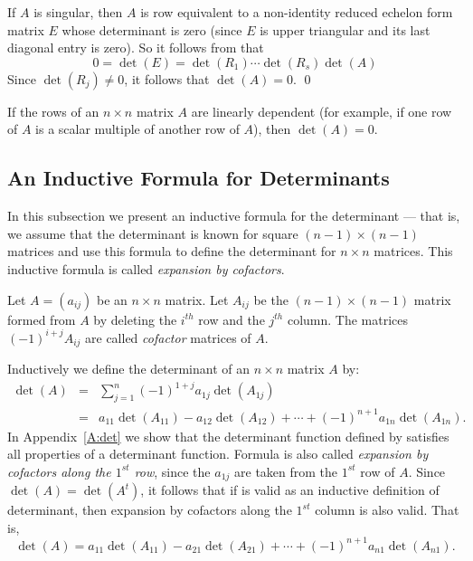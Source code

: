 \documentclass{ximera}
\begin{document}
If $A$ is singular, then $A$ is row equivalent to a non-identity
reduced echelon form matrix $E$ whose determinant is zero (since
$E$ is upper triangular and its last diagonal entry is zero).
So it follows from
 that 
\[
0=\det(E) = \det(R_1)\cdots\det(R_s)\det(A)
\]
Since $\det(R_j)\neq 0$, it follows that $\det(A)=0$.  \qed

\begin{cor}
If the rows of an $n\times n$ matrix $A$ are linearly dependent (for example,
if one row of $A$ is a scalar multiple of another row of $A$), then 
$\det(A)=0$.
\end{cor}


\subsection*{An Inductive Formula for Determinants} 
 
In this subsection we present an inductive formula for the
determinant --- that is, we assume that the determinant is known
for square $(n-1)\times(n-1)$ matrices and use this formula to
define the determinant for $n\times n$ matrices.  This inductive formula
is called {\em expansion by cofactors\/}.
 
Let $A=(a_{ij})$ be an $n\times n$ matrix.  Let $A_{ij}$ be the
$(n-1)\times(n-1)$ matrix formed from $A$ by deleting the
$i^{th}$ row and the $j^{th}$ column.  The matrices $(-1)^{i+j}A_{ij}$ are
called {\em cofactor\/}  matrices of $A$.  

Inductively we define the determinant of an $n\times n$ matrix $A$ by:
\begin{eqnarray}  
\det(A) & = & \sum^n_{j=1} (-1)^{1+j}a_{1j}\det(A_{1j}) \nonumber
\\  & = &
a_{11}\det(A_{11})-a_{12}\det(A_{12})+\cdots+(-1)^{n+1}a_{1n}\det(A_{1n}).
    \label{e:inductdet}
\end{eqnarray} 
In Appendix~\ref{A:det} we show that the determinant function defined by 
 satisfies all properties of a determinant function.
Formula  is also called {\em expansion by cofactors along 
the $1^{st}$ row\/}, since the $a_{1j}$ are taken from the $1^{st}$ row 
of $A$.  Since $\det(A)=\det(A^t)$, it follows that if  is 
valid as an inductive definition of determinant, then expansion by cofactors 
along the $1^{st}$ column is also valid.  That is,
\begin{equation}  \label{e:inductdetc}
\det(A) = 
a_{11}\det(A_{11})-a_{21}\det(A_{21})+\cdots+(-1)^{n+1}a_{n1}\det(A_{n1}).
\end{equation} 
\end{document}
